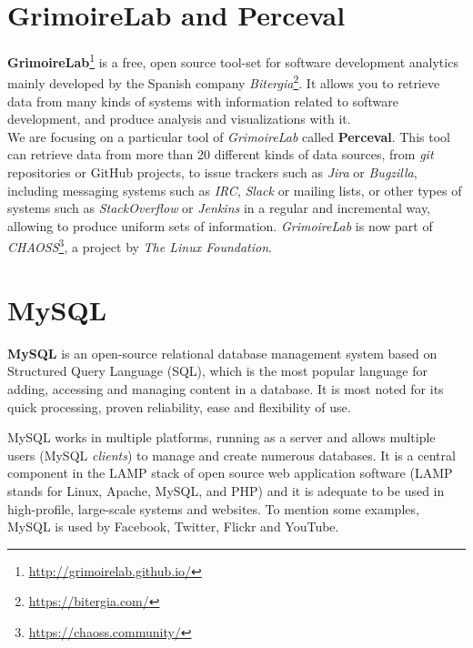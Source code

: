 \documentclass[a4paper, 12pt]{book}
\begin{document}
\section{GrimoireLab and Perceval}
\label{sec:grimoire}
\textbf{GrimoireLab}\footnote{\url{http://grimoirelab.github.io/}} is a free, open source tool-set for software development analytics
mainly developed by the Spanish company \emph{Bitergia}\footnote{\url{https://bitergia.com/}}.
It allows you to retrieve data from many kinds of systems with information related to software development, and produce
analysis and visualizations with it.\\
We are focusing on a particular tool of \emph{GrimoireLab} called \textbf{Perceval}. This tool can retrieve data from more
than 20 different kinds of data sources, from \emph{git} repositories or GitHub projects, to issue trackers such as \emph{Jira}
or \emph{Bugzilla}, including messaging systems such as \emph{IRC}, \emph{Slack} or mailing lists, or other types of systems such as
\emph{StackOverflow} or \emph{Jenkins} in a regular and incremental way, allowing to produce uniform sets of information.
\newline \emph{GrimoireLab} is now part of \emph{CHAOSS}\footnote{\url{https://chaoss.community/}}, a project by \emph{The Linux Foundation}.
\section{MySQL}
\textbf{MySQL} is an open-source relational database management system based on Structured Query Language (SQL),
which is the most popular language for adding, accessing and managing content in a database. It is most noted for its quick processing,
proven reliability, ease and flexibility of use.\par
MySQL works in multiple platforms, running as a server and allows multiple users (MySQL \emph{clients}) to manage and create numerous databases.
It is a central component in the LAMP stack of open source web application
software (LAMP stands for Linux, Apache, MySQL, and PHP) and it is adequate to be used in high-profile, large-scale systems and websites.
To mention some examples, MySQL is used by Facebook, Twitter, Flickr and YouTube.
\cleardoublepage
\end{document}
